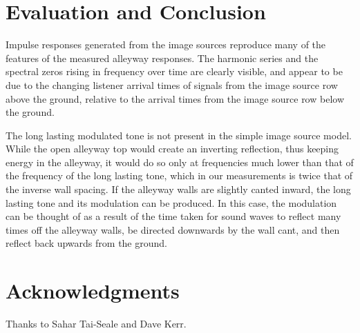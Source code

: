 \documentclass{aes137}
\begin{document}


\section{Evaluation and Conclusion}

Impulse responses generated from the image sources reproduce many of
the features of the measured alleyway responses. The harmonic series
and the spectral zeros rising in frequency over time are clearly
visible, and appear to be due to the changing listener arrival times
of signals from the image source row above the ground, relative to the
arrival times from the image source row below the ground.



The long lasting modulated tone is not present in the simple image
source model. While the open alleyway top would create an inverting
reflection, thus keeping energy in the alleyway, it would do so only
at frequencies much lower than that of the frequency of the long
lasting tone, which in our measurements is twice that of the inverse
wall spacing. If the alleyway walls are slightly canted inward, the
long lasting tone and its modulation can be produced. In this case,
the modulation can be thought of as a result of the time taken for
sound waves to reflect many times off the alleyway walls, be directed
downwards by the wall cant, and then reflect back upwards from the
ground.

\section{Acknowledgments}
Thanks to Sahar Tai-Seale and Dave Kerr.

%
%
\end{document}

